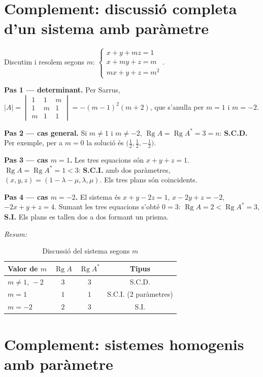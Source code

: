 \section{Complement: discussió completa d'un sistema amb paràmetre}

Discutim i resolem segons $m$: $\begin{cases}x+y+mz=1\\x+my+z=m\\mx+y+z=m^{2}\end{cases}$.

\textbf{Pas 1 --- determinant.} Per Sarrus, $|A|=\begin{vmatrix}1&1&m\\1&m&1\\m&1&1\end{vmatrix}=-(m-1)^{2}(m+2)$, que s'anul\textperiodcentered{}la per $m=1$ i $m=-2$.

\textbf{Pas 2 --- cas general.} Si $m\neq1$ i $m\neq-2$, $\operatorname{Rg}A=\operatorname{Rg}A^{*}=3=n$: \textbf{S.C.D.} Per exemple, per a $m=0$ la solució és $\bigl(\tfrac12,\tfrac12,-\tfrac12\bigr)$.

\textbf{Pas 3 --- cas $m=1$.} Les tres equacions són $x+y+z=1$. $\operatorname{Rg}A=\operatorname{Rg}A^{*}=1<3$: \textbf{S.C.I.} amb dos paràmetres, $(x,y,z)=(1-\lambda-\mu,\lambda,\mu)$. Els tres plans són coincidents.

\textbf{Pas 4 --- cas $m=-2$.} El sistema és $x+y-2z=1$, $x-2y+z=-2$, $-2x+y+z=4$. Sumant les tres equacions s'obté $0=3$: $\operatorname{Rg}A=2<\operatorname{Rg}A^{*}=3$, \textbf{S.I.} Els plans es tallen dos a dos formant un prisma.

\emph{Resum:}

\begin{table}[!htbp]
\centering
\renewcommand{\arraystretch}{1.3}
\begin{tabular}{lccc}
\toprule
Valor de $m$ & $\operatorname{Rg}A$ & $\operatorname{Rg}A^{*}$ & Tipus \\
\midrule
$m\neq1,\,-2$ & $3$ & $3$ & S.C.D. \\
$m=1$ & $1$ & $1$ & S.C.I. (2 paràmetres) \\
$m=-2$ & $2$ & $3$ & S.I. \\
\bottomrule
\end{tabular}
\caption{Discussió del sistema segons $m$}
\end{table}

\section{Complement: sistemes homogenis amb paràmetre}

